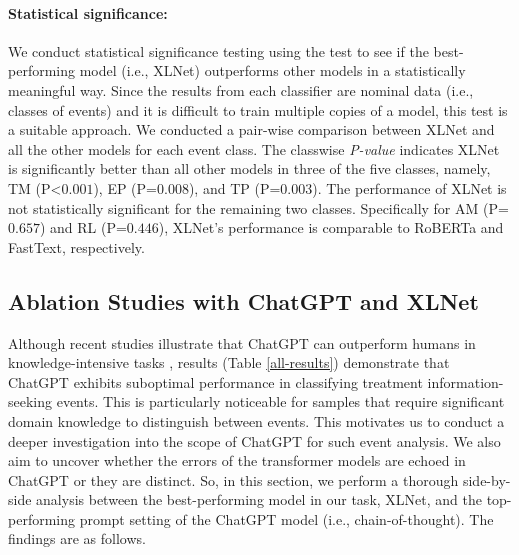 \documentclass[letterpaper]{article}
\begin{document}
\paragraph{Statistical significance:}
We conduct statistical significance testing using the \citeauthor{mcnemar1947note}  test to see if the best-performing model (i.e., XLNet) outperforms other models in a statistically meaningful way. Since the results from each classifier are nominal data (i.e., classes of events) and it is difficult to train multiple copies of a model, this test is a suitable approach. We conducted a pair-wise comparison between XLNet and all the other models for each event class. The classwise \textit{P-value} indicates XLNet is significantly better than all other models in three of the five classes, namely, TM (P\textless$0.001$), EP (P=$0.008$), and TP (P=$0.003$). The performance of XLNet is not statistically significant for the remaining two classes. Specifically for AM (P=$0.657$) and RL (P=$0.446$), XLNet's performance is comparable to RoBERTa and FastText, respectively. %



\subsection{Ablation Studies with ChatGPT and XLNet}
\label{ablation}
Although recent studies illustrate that ChatGPT can outperform humans in knowledge-intensive tasks \cite{Gilardi_2023}, results (Table \ref{all-results}) demonstrate that ChatGPT exhibits suboptimal performance in classifying treatment information-seeking events. This is particularly noticeable for samples that require significant domain knowledge to distinguish between events. This motivates us to conduct a deeper investigation into the scope of ChatGPT for such event analysis. We also aim to uncover whether the errors of the transformer models are echoed in ChatGPT or they are distinct. So, in this section, we perform a thorough side-by-side analysis between the best-performing model in our task, XLNet, and the top-performing prompt setting of the ChatGPT model (i.e., chain-of-thought). The findings are as follows.
\end{document}

